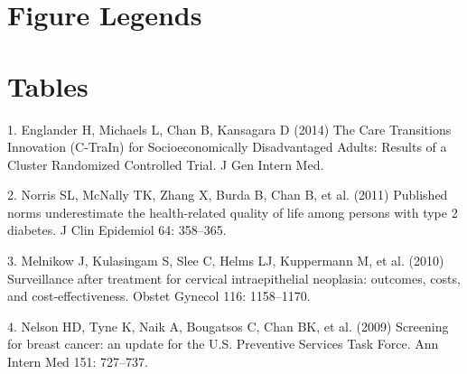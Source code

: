 \documentclass[10pt]{article}
\begin{document}
\section*{Figure Legends}\label{figure-legends}

\section*{Tables}\label{tables}

1. Englander H, Michaels L, Chan B, Kansagara D (2014) The Care
Transitions Innovation (C-TraIn) for Socioeconomically Disadvantaged
Adults: Results of a Cluster Randomized Controlled Trial. J Gen Intern
Med.

2. Norris SL, McNally TK, Zhang X, Burda B, Chan B, et al. (2011)
Published norms underestimate the health-related quality of life among
persons with type 2 diabetes. J Clin Epidemiol 64: 358--365.

3. Melnikow J, Kulasingam S, Slee C, Helms LJ, Kuppermann M, et al.
(2010) Surveillance after treatment for cervical intraepithelial
neoplasia: outcomes, costs, and cost-effectiveness. Obstet Gynecol 116:
1158--1170.

4. Nelson HD, Tyne K, Naik A, Bougatsos C, Chan BK, et al. (2009)
Screening for breast cancer: an update for the U.S. Preventive Services
Task Force. Ann Intern Med 151: 727--737.
\end{document}
